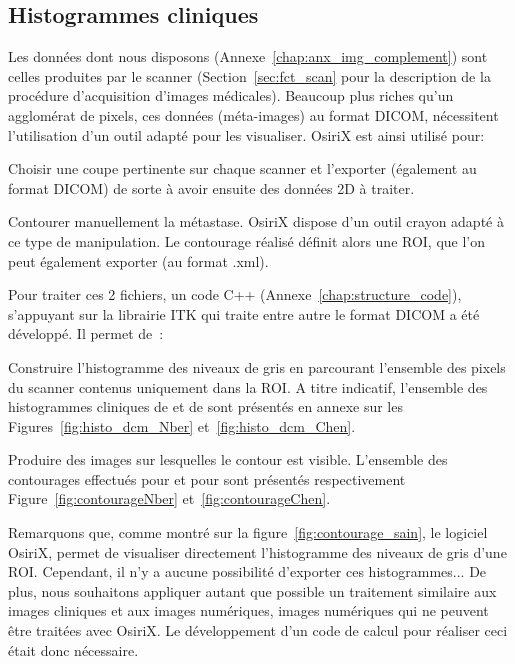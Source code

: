 \documentclass[main.tex]{subfiles}
\begin{document}
\subsection{Histogrammes cliniques} 
Les données dont nous disposons (\cf Annexe~\ref{chap:anx_img_complement}) sont celles produites par le scanner (\cf Section~\ref{sec:fct_scan} pour la description de la procédure d'acquisition d'images médicales). Beaucoup plus riches qu'un agglomérat de pixels, ces données (méta-images) au format DICOM, nécessitent l'utilisation d'un outil adapté pour les visualiser. OsiriX est ainsi utilisé pour:
\begin{myitemize}
\item Choisir une coupe pertinente sur chaque scanner et l'exporter (également au format DICOM) de sorte à avoir ensuite des données 2D à traiter.
\item Contourer manuellement la métastase. OsiriX dispose d'un outil crayon adapté à ce type de manipulation. Le contourage réalisé définit alors une ROI, que l'on peut également exporter (au format .xml).
\end{myitemize}
Pour traiter ces 2 fichiers, un code C++ (\cf Annexe~\ref{chap:structure_code}), s'appuyant sur la librairie ITK qui traite entre autre le format DICOM a été développé. Il permet de~:
\begin{myitemize}
\item Construire l'histogramme des niveaux de gris en parcourant  l'ensemble des pixels du scanner contenus uniquement dans la ROI. 
A titre indicatif, l'ensemble des histogrammes cliniques de \Nber et de \Chen sont présentés en annexe sur les Figures~\ref{fig:histo_dcm_Nber} et~\ref{fig:histo_dcm_Chen}. %
\item Produire des images sur lesquelles le contour est visible. L'ensemble des contourages effectués pour \Nber et pour \Chen sont présentés respectivement Figure~\ref{fig:contourageNber} et~\ref{fig:contourageChen}.
\end{myitemize}


Remarquons que, comme montré sur la figure~\ref{fig:contourage_sain}, le logiciel OsiriX, permet de visualiser directement l'histogramme des niveaux de gris d'une ROI. Cependant, il n'y a aucune possibilité d'exporter ces histogrammes... De plus, nous souhaitons appliquer autant que possible un traitement similaire aux images cliniques et aux images numériques, images numériques qui ne peuvent être traitées avec OsiriX. Le développement d'un code de calcul pour réaliser ceci était donc nécessaire.
\end{document}
